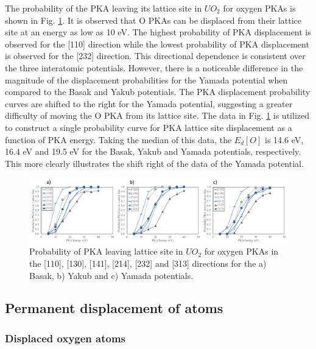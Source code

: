 \documentclass[8pt]{article}   	%
\begin{document}
The probability of the PKA leaving its lattice site in $UO_2$ for oxygen PKAs is shown in Fig. \ref{fig:lato}. It is observed that O PKAs can be displaced from their lattice site at an energy as low as 10 eV. The highest probability of PKA displacement is observed for the [110] direction while the lowest probability of PKA displacement is observed for the [232] direction. This directional dependence is consistent over the three interatomic potentials. However, there is a noticeable difference in the magnitude of the displacement probabilities for the Yamada potential when compared to the Basak and Yakub potentials. The PKA displacement probability curves are shifted to the right for the Yamada potential, suggesting a greater difficulty of moving the O PKA from its lattice site. The data in Fig. \ref{fig:lato} is utilized to construct a single probability curve for PKA lattice site displacement as a function of PKA energy. Taking the median of this data, the $E_d [O]$ is 14.6 eV, 16.4 eV and 19.5 eV for the Basak, Yakub and Yamada potentials, respectively. This more clearly illustrates the shift right of the data of the Yamada potential.

\begin{figure}[h]
 \centering
 \includegraphics[width=1.0\textwidth]{lat_O.png}
 \caption{Probability of PKA leaving lattice site in $UO_2$ for oxygen PKAs in the [110], [130], [141], [214], [232] and [313] directions for the a) Basak, b) Yakub and c) Yamada potentials.  }
 \label{fig:lato}
\end{figure}

\FloatBarrier

\subsection{Permanent displacement of atoms}
\subsubsection{Displaced oxygen atoms}
\hspace{5mm}
\end{document}
